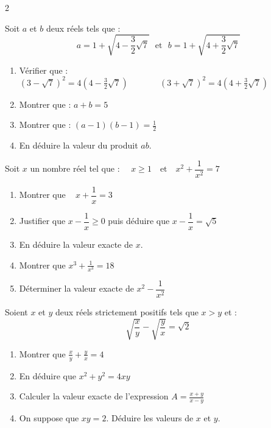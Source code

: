 \documentclass[10pt, a4paper]{article}
\begin{document}
\begin{multicols*}{2}
\begin{Exercice}[][20 min][★★]
Soit $a$ et $b$ deux réels tels que :
\begin{equation*}
    a=1+\sqrt{4-\frac{3}{2}\sqrt{7}} ~~~\text{et}~~~ b=1+\sqrt{4+\frac{3}{2}\sqrt{7}}
\end{equation*}
\begin{enumerate}
    \item Vérifier que :
    \vspace{0.2cm} \\
    $(3-\sqrt{7})^2=4\left(4-\frac{3}{2}\sqrt{7}\right)$
    ~~~~~~ $(3+\sqrt{7})^2=4\left(4+\frac{3}{2}\sqrt{7}\right)$
    \item Montrer que : $a+b=5$
    \item Montrer que : $(a-1)(b-1)=\frac{1}{2}$
    \item En déduire la valeur du produit $ab$.
\end{enumerate}
\end{Exercice}

\begin{Exercice}[][20 min][★★]
Soit $x$ un nombre réel tel que :~~ $x \ge 1 \quad \text{et} \quad x^2 + \dfrac{1}{x^2} = 7$
\begin{enumerate}
    \item Montrer que ~ $x + \dfrac{1}{x} = 3$

    \item Justifier que $x - \dfrac{1}{x} \ge 0$ puis déduire que
    $x - \dfrac{1}{x} = \sqrt{5}$

    \item En déduire la valeur exacte de $x$.

    \item Montrer que $x^3 + \frac{1}{x^3} = 18$

    \item Déterminer la valeur exacte de $x^2 - \dfrac{1}{x^2}$
\end{enumerate}
\end{Exercice}

\begin{Exercice}[][20 min][★★★]
Soient $x$ et $y$ deux réels strictement positifs tels que $x > y$ et :
$$ \sqrt{\frac{x}{y}} - \sqrt{\frac{y}{x}} = \sqrt{2} $$
\begin{enumerate}
    \item Montrer que $\frac{x}{y} + \frac{y}{x} = 4$

    \item En déduire que $x^2 + y^2 = 4xy$

    \item Calculer la valeur exacte de l'expression $A = \frac{x+y}{x-y}$

    \item On suppose que $xy = 2$. Déduire les valeurs de $x$ et $y$.
\end{enumerate}
\end{Exercice}


\end{multicols*}
\end{document}
